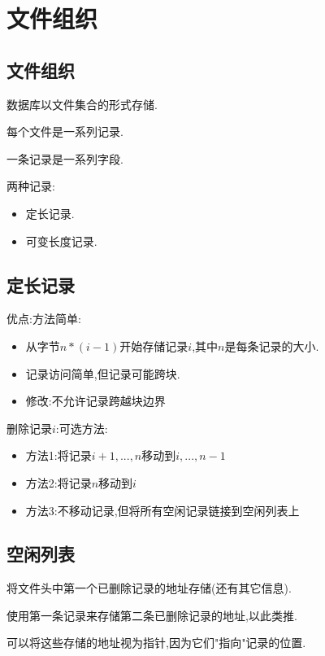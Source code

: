 \section{文件组织}

\subsection{文件组织}

数据库以文件集合的形式存储.

每个文件是一系列记录.

一条记录是一系列字段.

两种记录:

\begin{itemize}
    \item 定长记录.
    \item 可变长度记录.
\end{itemize}

\subsection{定长记录}

优点:方法简单:

\begin{itemize}
    \item 从字节$n*(i-1)$开始存储记录$i$,其中$n$是每条记录的大小.
    \item 记录访问简单,但记录可能跨块.
    \item 修改:不允许记录跨越块边界
\end{itemize}

删除记录$i$:可选方法:

\begin{itemize}
    \item 方法1:将记录$i+1,...,n$移动到$i,...,n-1$
    \item 方法2:将记录$n$移动到$i$
    \item 方法3:不移动记录,但将所有空闲记录链接到空闲列表上
\end{itemize}

\subsection{空闲列表}

将文件头中第一个已删除记录的地址存储(还有其它信息).

使用第一条记录来存储第二条已删除记录的地址,以此类推.

可以将这些存储的地址视为指针,因为它们"指向"记录的位置.

